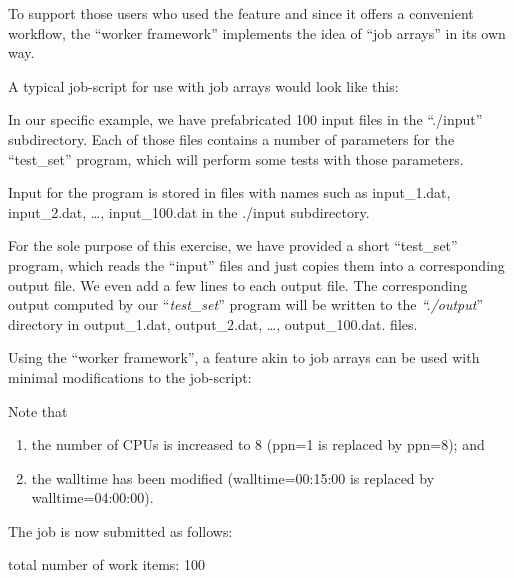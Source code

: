 To support those users who used the feature and since it offers a convenient
workflow, the ``worker framework'' implements the idea of ``job arrays'' in its
own way.

A typical job-script for use with job arrays would look like this:


In our specific example, we have prefabricated 100 input files in the
``./input'' subdirectory. Each of those files contains a number of parameters
for the ``test\_set'' program, which will perform some tests with those
parameters.

Input for the program is stored in files with names such as input\_1.dat,
input\_2.dat, \ldots, input\_100.dat in the ./input subdirectory.


For the sole purpose of this exercise, we have provided a short ``test\_set''
program, which reads the ``input'' files and just copies them into a
corresponding output file.  We even add a few lines to each output file. The
corresponding output computed by our ``\textit{test\_set}'' program will be
written to the \textit{``./output}'' directory in output\_1.dat, output\_2.dat,
\ldots, output\_100.dat. files.


Using the ``worker framework'', a feature akin to job arrays can be used with
minimal modifications to the job-script:


Note that

\begin{enumerate}
\item  the number of CPUs is increased to 8 (ppn=1 is replaced by ppn=8); and
\item  the walltime has been modified (walltime=00:15:00 is replaced by walltime=04:00:00).
\end{enumerate}

The job is now submitted as follows:
\begin{prompt}
total number of work items: 100
\end{prompt}

